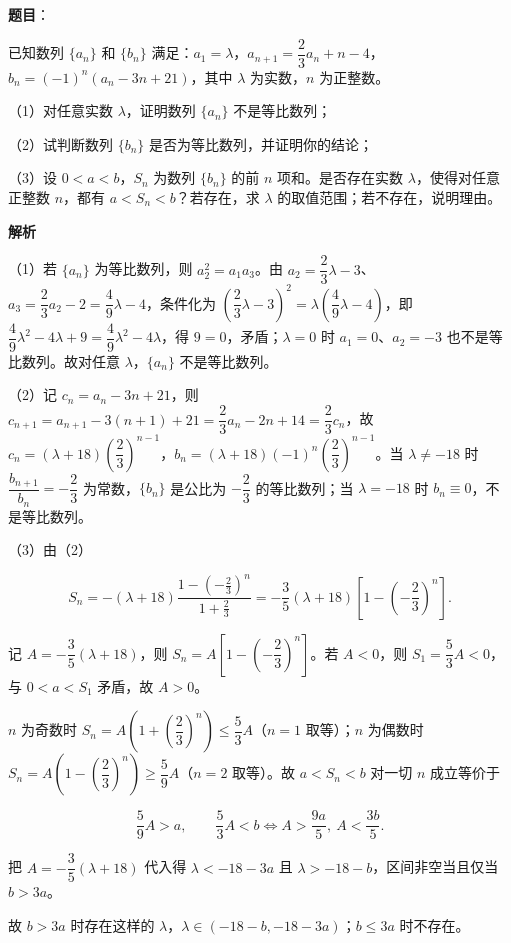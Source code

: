 \begin{answer}

\textbf{题目}：

已知数列 $\{a_n\}$ 和 $\{b_n\}$ 满足：$a_1=\lambda$，$a_{n+1}=\dfrac23a_n+n-4$，$b_n=(-1)^n(a_n-3n+21)$，其中 $\lambda$ 为实数，$n$ 为正整数。

（1）对任意实数 $\lambda$，证明数列 $\{a_n\}$ 不是等比数列；

（2）试判断数列 $\{b_n\}$ 是否为等比数列，并证明你的结论；

（3）设 $0<a<b$，$S_n$ 为数列 $\{b_n\}$ 的前 $n$ 项和。是否存在实数 $\lambda$，使得对任意正整数 $n$，都有 $a<S_n<b$？若存在，求 $\lambda$ 的取值范围；若不存在，说明理由。

\textbf{解析}

（1）若 $\{a_n\}$ 为等比数列，则 $a_2^2=a_1a_3$。由 $a_2=\dfrac23\lambda-3$、$a_3=\dfrac23a_2-2=\dfrac49\lambda-4$，条件化为 $\left(\dfrac23\lambda-3\right)^2=\lambda\left(\dfrac49\lambda-4\right)$，即 $\dfrac49\lambda^2-4\lambda+9=\dfrac49\lambda^2-4\lambda$，得 $9=0$，矛盾；$\lambda=0$ 时 $a_1=0$、$a_2=-3$ 也不是等比数列。故对任意 $\lambda$，$\{a_n\}$ 不是等比数列。

（2）记 $c_n=a_n-3n+21$，则 $c_{n+1}=a_{n+1}-3(n+1)+21=\dfrac23a_n-2n+14=\dfrac23c_n$，故 $c_n=(\lambda+18)\left(\dfrac23\right)^{n-1}$，$b_n=(\lambda+18)(-1)^n\left(\dfrac23\right)^{n-1}$。当 $\lambda\neq-18$ 时 $\dfrac{b_{n+1}}{b_n}=-\dfrac23$ 为常数，$\{b_n\}$ 是公比为 $-\dfrac23$ 的等比数列；当 $\lambda=-18$ 时 $b_n\equiv0$，不是等比数列。

（3）由（2）

\nopagebreak[4]
\[S_n=-(\lambda+18)\frac{1-\left(-\frac23\right)^n}{1+\frac23}=-\frac35(\lambda+18)\left[1-\left(-\frac23\right)^n\right].\]

记 $A=-\dfrac35(\lambda+18)$，则 $S_n=A\left[1-\left(-\dfrac23\right)^n\right]$。若 $A<0$，则 $S_1=\dfrac53A<0$，与 $0<a<S_1$ 矛盾，故 $A>0$。

$n$ 为奇数时 $S_n=A\left(1+\left(\dfrac23\right)^n\right)\leqslant\dfrac53A$（$n=1$ 取等）；$n$ 为偶数时 $S_n=A\left(1-\left(\dfrac23\right)^n\right)\geqslant\dfrac59A$（$n=2$ 取等）。故 $a<S_n<b$ 对一切 $n$ 成立等价于

\nopagebreak[4]
\[\frac59A>a,\qquad \frac53A<b\iff A>\frac{9a}5,\ A<\frac{3b}5.\]

把 $A=-\dfrac35(\lambda+18)$ 代入得 $\lambda<-18-3a$ 且 $\lambda>-18-b$，区间非空当且仅当 $b>3a$。

故 $b>3a$ 时存在这样的 $\lambda$，$\lambda\in(-18-b,-18-3a)$；$b\leqslant3a$ 时不存在。


\end{answer}